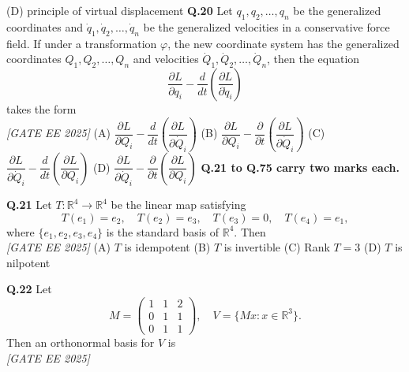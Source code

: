 \documentclass[11pt]{article}
\begin{document}
(D) principle of virtual displacement
\newline
\newline
\textbf{Q.20} Let $q_1, q_2, \dots, q_n$ be the generalized coordinates and $\dot{q}_1, \dot{q}_2, \dots, \dot{q}_n$ be the generalized velocities in a conservative force field. If under a transformation $\varphi$, the new coordinate system has the generalized coordinates $Q_1, Q_2, \dots, Q_n$ and velocities $\dot{Q}_1, \dot{Q}_2, \dots, \dot{Q}_n$, then the equation \newline
\[
\frac{\partial L}{\partial q_i} - \frac{d}{dt} \left( \frac{\partial L}{\partial \dot{q}_i} \right)
\]
takes the form
\\[1ex] \textit{[GATE EE 2025]}
\newline
(A) $\dfrac{\partial L}{\partial Q_i} - \dfrac{d}{dt} \left( \dfrac{\partial L}{\partial \dot{Q}_i} \right)$ \hspace{10mm}
(B) $\dfrac{\partial L}{\partial Q_i} - \dfrac{\partial}{\partial t} \left( \dfrac{\partial L}{\partial \dot{Q}_i} \right)$ \newline
(C) $\dfrac{\partial L}{\partial \dot{Q}_i} - \dfrac{d}{dt} \left( \dfrac{\partial L}{\partial Q_i} \right)$ \hspace{10mm}
(D) $\dfrac{\partial L}{\partial \dot{Q}_i} - \dfrac{\partial}{\partial t} \left( \dfrac{\partial L}{\partial Q_i} \right)$
\newline
\newline
\textbf{Q.21 to Q.75 carry two marks each.}

\textbf{Q.21} Let $T: \mathbb{R}^4 \rightarrow \mathbb{R}^4$ be the linear map satisfying \newline
\[
T(e_1) = e_2, \quad T(e_2) = e_3, \quad T(e_3) = 0, \quad T(e_4) = e_1,
\]
where $\{ e_1, e_2, e_3, e_4 \}$ is the standard basis of $\mathbb{R}^4$. Then 
\\[1ex] \textit{[GATE EE 2025]}
\newline
(A) $T$ is idempotent \hspace{10mm}
(B) $T$ is invertible \hspace{10mm}
(C) Rank $T = 3$ \hspace{10mm}
(D) $T$ is nilpotent
\newline
\newline

\noindent\textbf{Q.22}  
Let  
\[
M = \begin{pmatrix}
1 & 1 & 2 \\
0 & 1 & 1 \\
0 & 1 & 1
\end{pmatrix}, \quad
V = \{ Mx : x \in \mathbb{R}^3\}.
\]
Then an orthonormal basis for \(V\) is  
\\[1ex] \textit{[GATE EE 2025]}
\end{document}
